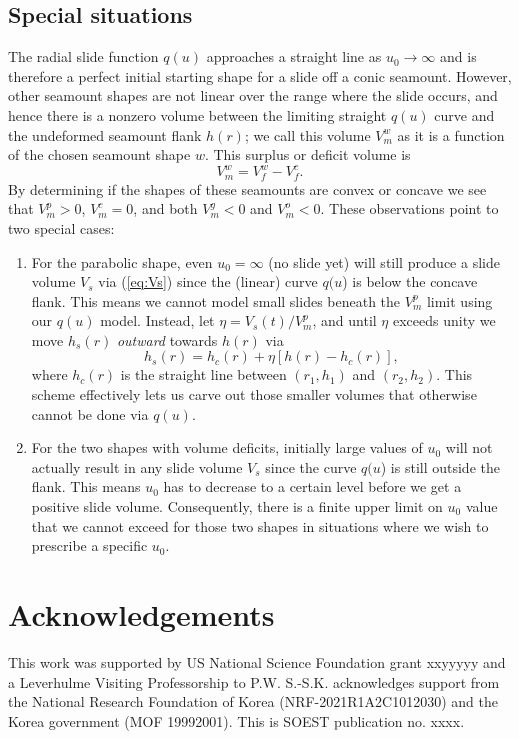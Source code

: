 \subsection{Special situations}

The radial slide function $q(u)$ approaches a straight line as $u_0 \rightarrow \infty$ 
and is therefore a perfect initial starting shape for a slide off a conic seamount.  However, other
seamount shapes are not linear over the range where the slide occurs, and hence there is a nonzero
volume between the limiting straight $q(u)$ curve and the undeformed seamount flank $h(r)$;
we call this volume $V_m^w$ as it is a function of the chosen seamount shape $w$. This
surplus or deficit volume is
\begin{equation*}
V_m^w = V_f^w - V_f^c.
\end{equation*}
By determining if the shapes of these seamounts are convex or concave we see that $V_m^p > 0$, $V_m^c = 0$,
and both $V_m^g < 0$ and $V_m^o < 0$. These observations point to two special cases:

\begin{enumerate}
  \item For the parabolic shape, even $u_0 = \infty$ (no slide yet) will still produce a slide volume
  $V_s$ via (\ref{eq:Vs}) since the (linear) curve $q(u$) is below the concave flank.  This means we
  cannot model small slides beneath the $V_m^p$ limit using our $q(u)$ model. Instead, let
  $\eta = V_s(t)/V_m^p$, and until $\eta$ exceeds unity we move $h_s(r)$ \emph{outward} towards $h(r)$ via
  \begin{equation*}
  h_s(r) = h_c(r) + \eta \left [h(r) - h_c(r) \right ],
  \end{equation*}
  where $h_c(r)$ is the straight line between $(r_1, h_1)$ and $(r_2, h_2)$.  This scheme effectively lets us 
  carve out those smaller volumes that otherwise cannot be done via $q(u)$.
  \item For the two shapes with volume deficits, initially large values of $u_0$ will not actually
  result in any slide volume $V_s$ since the curve $q(u$) is still outside the flank. This means $u_0$
  has to decrease to a certain level before we get a positive slide volume. Consequently, there is a
  finite upper limit on $u_0$ value that we cannot exceed for those two shapes in situations where
  we wish to prescribe a specific $u_0$.
\end{enumerate}

\section{Acknowledgements}
This work was supported by US National Science Foundation grant xxyyyyy and a Leverhulme Visiting
Professorship to P.W. S.-S.K. acknowledges support from the National Research Foundation of Korea
(NRF-2021R1A2C1012030) and the Korea government (MOF 19992001).
This is SOEST publication no. xxxx.
